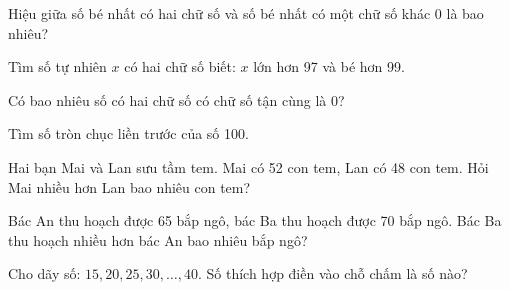 \begin{ex}
Hiệu giữa số bé nhất có hai chữ số và số bé nhất có một chữ số khác 0 là bao nhiêu?
\end{ex}

\begin{ex}
Tìm số tự nhiên $x$ có hai chữ số biết: $x$ lớn hơn 97 và bé hơn 99.
\end{ex}

\begin{ex}
Có bao nhiêu số có hai chữ số có chữ số tận cùng là 0?
\end{ex}

\begin{ex}
Tìm số tròn chục liền trước của số 100.
\end{ex}

\begin{ex}
Hai bạn Mai và Lan sưu tầm tem. Mai có 52 con tem, Lan có 48 con tem. Hỏi Mai nhiều hơn Lan bao nhiêu con tem?
\end{ex}

\begin{ex}
Bác An thu hoạch được 65 bắp ngô, bác Ba thu hoạch được 70 bắp ngô. Bác Ba thu hoạch nhiều hơn bác An bao nhiêu bắp ngô?
\end{ex}

\begin{ex}
Cho dãy số: $15, 20, 25, 30, \dots, 40$. Số thích hợp điền vào chỗ chấm là số nào?
\end{ex}
